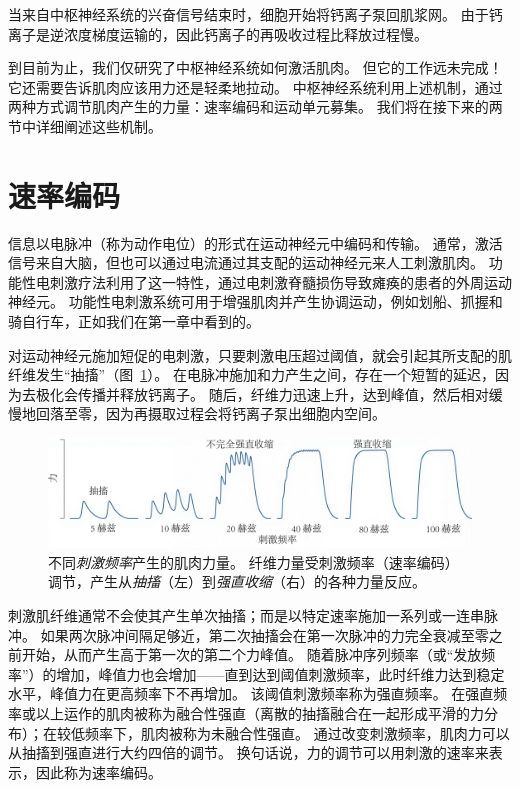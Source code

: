 当来自中枢神经系统的兴奋信号结束时，细胞开始将钙离子泵回肌浆网。
由于钙离子是逆浓度梯度运输的，因此钙离子的再吸收过程比释放过程慢。


到目前为止，我们仅研究了中枢神经系统如何激活肌肉。
但它的工作远未完成！它还需要告诉肌肉应该用力还是轻柔地拉动。
中枢神经系统利用上述机制，通过两种方式调节肌肉产生的力量：速率编码和运动单元募集。
我们将在接下来的两节中详细阐述这些机制。


\section{速率编码}

信息以电脉冲（称为动作电位）的形式在运动神经元中编码和传输。
通常，激活信号来自大脑，但也可以通过电流通过其支配的运动神经元来人工刺激肌肉。
功能性电刺激疗法利用了这一特性，通过电刺激脊髓损伤导致瘫痪的患者的外周运动神经元。
功能性电刺激系统可用于增强肌肉并产生协调运动，例如划船、抓握和骑自行车，正如我们在第一章中看到的。


对运动神经元施加短促的电刺激，只要刺激电压超过阈值，就会引起其所支配的肌纤维发生“抽搐”（图~\ref{fig:4_12}）。
在电脉冲施加和力产生之间，存在一个短暂的延迟，因为去极化会传播并释放钙离子。
随后，纤维力迅速上升，达到峰值，然后相对缓慢地回落至零，因为再摄取过程会将钙离子泵出细胞内空间。


\begin{figure}[!htb]
	\centering
	\includegraphics[width=1.0\linewidth]{chap4/4_12}
	\caption{不同\textit{刺激频率}产生的肌肉力量。
		纤维力量受刺激频率（速率编码）调节，产生从\textit{抽搐}（左）到\textit{强直收缩}（右）的各种力量反应。 \label{fig:4_12}}
\end{figure}


刺激肌纤维通常不会使其产生单次抽搐；而是以特定速率施加一系列或一连串脉冲。
如果两次脉冲间隔足够近，第二次抽搐会在第一次脉冲的力完全衰减至零之前开始，从而产生高于第一次的第二个力峰值。
随着脉冲序列频率（或“发放频率”）的增加，峰值力也会增加——直到达到阈值刺激频率，此时纤维力达到稳定水平，峰值力在更高频率下不再增加。
该阈值刺激频率称为强直频率。
在强直频率或以上运作的肌肉被称为融合性强直（离散的抽搐融合在一起形成平滑的力分布）；在较低频率下，肌肉被称为未融合性强直。
通过改变刺激频率，肌肉力可以从抽搐到强直进行大约四倍的调节。
换句话说，力的调节可以用刺激的速率来表示，因此称为速率编码。


